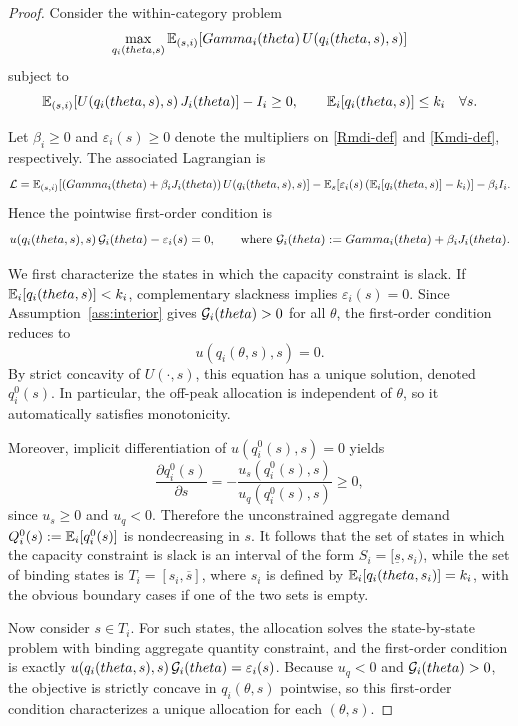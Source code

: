 \documentclass[master.tex]{subfiles}
\begin{document}
\begin{proof}
Consider the within-category problem
\[
\max_{q_i(theta,s)} 
\mathbb{E}_{(s,i)}\!\left[Gamma_i(theta)\,U\!\left(q_i(theta,s),s\right)\right]
\]
subject to
\[
\mathbb{E}_{(s,i)}\!\left[U\!\left(q_i(theta,s),s\right)J_i(theta)\right]-I_i \ge 0,
\qquad
\mathbb{E}_i\!\left[q_i(theta,s)\right]\le k_i
\quad \forall s.
\]

Let \(\beta_i \ge 0\) and \(\varepsilon_i(s)\ge 0\) denote the multipliers on \eqref{Rmdi-def} and \eqref{Kmdi-def}, respectively. The associated Lagrangian is
\[
\mathcal L
=
\mathbb{E}_{(s,i)}\!\left[
\left(Gamma_i(theta)+\beta_i J_i(theta)\right)
U\!\left(q_i(theta,s),s\right)
\right]
-
\mathbb{E}_s\!\left[
\varepsilon_i(s)
\left(\mathbb{E}_i[q_i(theta,s)]-k_i\right)
\right]
-
\beta_i I_i.
\]
Hence the pointwise first-order condition is
\[
u\!\left(q_i(theta,s),s\right)\mathcal{G}_i(theta)-\varepsilon_i(s)=0,
\qquad
\text{where }
\mathcal{G}_i(theta):=Gamma_i(theta)+\beta_i J_i(theta).
\]

We first characterize the states in which the capacity constraint is slack. If \(\mathbb{E}_i[q_i(theta,s)]<k_i\), complementary slackness implies \(\varepsilon_i(s)=0\). Since Assumption~\ref{ass:interior} gives \(\mathcal{G}_i(theta)>0\) for all \(\theta\), the first-order condition reduces to
\[
u\!\left(q_i(\theta,s),s\right)=0.
\]
By strict concavity of \(U(\cdot,s)\), this equation has a unique solution, denoted \(q_i^0(s)\). In particular, the off-peak allocation is independent of \(\theta\), so it automatically satisfies monotonicity.

Moreover, implicit differentiation of \(u(q_i^0(s),s)=0\) yields
\[
\frac{\partial q_i^0(s)}{\partial s}
=
-\frac{u_s\!\left(q_i^0(s),s\right)}{u_q\!\left(q_i^0(s),s\right)}
\ge 0,
\]
since \(u_s\ge 0\) and \(u_q<0\). Therefore the unconstrained aggregate demand $Q_i^0(s):=\mathbb{E}_i[q_i^0(s)]$ is nondecreasing in \(s\). It follows that the set of states in which the capacity constraint is slack is an interval of the form \(S_i=[\underline s,s_i)\), while the set of binding states is \(T_i=[s_i,\overline s]\), where \(s_i\) is defined by $\mathbb{E}_i\!\left[q_i(theta,s_i)\right]=k_i$, with the obvious boundary cases if one of the two sets is empty.

Now consider \(s\in T_i\). For such states, the allocation solves the state-by-state problem with binding aggregate quantity constraint, and the first-order condition is exactly $u\!\left(q_i(theta,s),s\right)\mathcal{G}_i(theta) = \varepsilon_i(s)$. Because \(u_q<0\) and \(\mathcal{G}_i(theta)>0\), the objective is strictly concave in \(q_i(\theta,s)\) pointwise, so this first-order condition characterizes a unique allocation for each \((\theta,s)\).


\end{proof}
\end{document}

